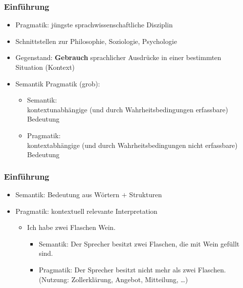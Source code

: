 \begin{frame}
\frametitle{Einführung}

\begin{itemize}
	\item Pragmatik: jüngste sprachwissenschaftliche Disziplin
	\item Schnittstellen zur Philosophie, Soziologie, Psychologie
	\item Gegenstand: \textbf{Gebrauch} sprachlicher Ausdrücke in einer bestimmten Situation (Kontext)
	\medskip
	\item Semantik \vs Pragmatik (grob):
	
	\begin{itemize}
		\item Semantik:\\
kontextunabhängige (und durch Wahrheitsbedingungen erfassbare) Bedeutung
		\item Pragmatik: \\
kontextabhängige  (und durch Wahrheitsbedingungen nicht erfassbare) Bedeutung
	\end{itemize}
	
\end{itemize}

\end{frame}



\begin{frame}
\frametitle{Einführung}

\begin{itemize}
	\item Semantik: Bedeutung aus Wörtern $+$ Strukturen
	\medskip
	\item Pragmatik: kontextuell relevante Interpretation
	
	\begin{itemize}
		\item Ich habe zwei Flaschen Wein.
		
		\begin{itemize}
			\item Semantik: Der Sprecher besitzt zwei Flaschen, die mit Wein gefüllt sind.
			\item Pragmatik: Der Sprecher besitzt nicht mehr als zwei Flaschen. (Nutzung: Zollerklärung, Angebot, Mitteilung, \dots)
		\end{itemize}
	\end{itemize}
\end{itemize}

\end{frame}


